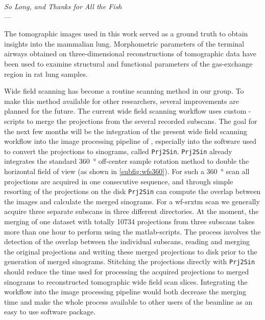 \acresetall
{}\label{ch:outlook}
\begin{flushright}{\slshape
	So Long, and Thanks for All the Fish} \\ \medskip
	---  \citep{Adams1984}
\end{flushright}
\vspace{6cm}

The tomographic images used in this work served as a ground truth to obtain insights into the mammalian lung. Morphometric parameters of the terminal airways obtained on three-dimensional reconstructions of tomographic data have been used to examine structural and functional parameters of the gas-exchange region in rat lung samples.

Wide field scanning has become a routine scanning method in our group. To make this method available for other researchers, several improvements are planned for the future. The current wide field scanning workflow uses custom -scripts to merge the projections from the several recorded subscans. The goal for the next few months will be the integration of the present wide field scanning workflow into the image processing pipeline of , especially into the software used to convert the projections to sinograms, called \texttt{Prj2Sin}. \texttt{Prj2Sin} already integrates the standard \SI{360}{\degree} off-center sample rotation method to double the horizontal field of view (as shown in \autoref{subfig:wfs360}). For such a \SI{360}{\degree} scan all projections are acquired in one consecutive sequence, and through simple resorting of the projections on the disk \texttt{Prj2Sin} can compute the overlap between the images and calculate the merged sinograms. For a \ac{wf-srxtm} scan we generally acquire three separate subscans in three different directories. At the moment, the merging of one dataset with totally \num{10734} projections from three subscans takes more than one hour to perform using the \ac{matlab}-scripts. The process involves the detection of the overlap between the individual subscans, reading and merging the original projections and writing these merged projections to disk prior to the generation of merged sinograms. Stitching the projections directly with \texttt{Prj2Sin} should reduce the time used for processing the acquired projections to merged sinograms to reconstructed tomographic wide field scan slices. Integrating the workflow into the image processing pipeline would both decrease the merging time and make the whole process available to other users of the beamline as an easy to use software package.

